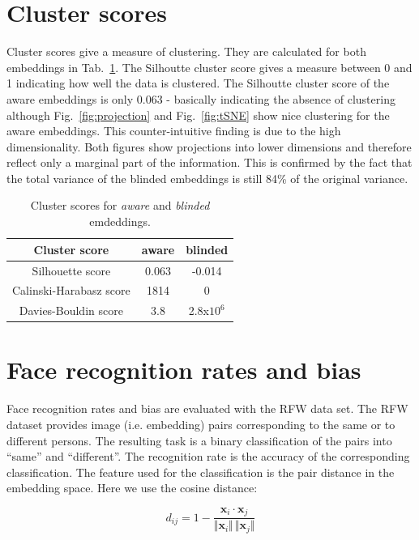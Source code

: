 \documentclass{report}
\begin{document}
\section{Cluster scores}

Cluster scores give a measure of clustering. They are calculated for both embeddings in Tab.~\ref{tab:cluster}. The Silhoutte cluster score gives a measure between 0 and 1 indicating how well the data is clustered. The Silhoutte cluster score of the aware embeddings is only 0.063 -  basically indicating the absence of clustering although Fig.~\ref{fig:projection} and Fig.~\ref{fig:tSNE} show nice clustering for the aware embeddings. This counter-intuitive finding is due to the high dimensionality. Both figures show projections into lower dimensions and therefore reflect only a marginal part of the information. This is confirmed by the fact that the total variance of the blinded embeddings is still 84\% of the original variance.   

\begin{table}
\begin{center}
\begin{tabular}{ c|c|c }
Cluster score & aware  & blinded  \\
\hline
Silhouette score & 0.063 & -0.014 \\ 
Calinski-Harabasz score & 1814 & 0 \\  
Davies-Bouldin score & 3.8 & 2.8x$10^6$  
\end{tabular}
\end{center}
\caption{Cluster scores for  \emph{aware}  and  \emph{blinded} emdeddings.}
\label{tab:cluster}
\end{table}

\section{Face recognition rates and bias}

Face recognition rates and bias are evaluated with the RFW data set. The RFW dataset provides image (i.e. embedding) pairs corresponding to the same or to different persons. The resulting task is a binary classification of the pairs into ``same'' and ``different''. The recognition rate is the accuracy of the corresponding classification. The feature used for the classification is the pair distance in the embedding space. Here we use the cosine distance:

\begin{equation}
\label{eq:cos}
	d_{ij} = 1 - \frac{\bm{x}_i\cdot \bm{x}_j}{\Vert \bm{x}_i \Vert\,\Vert \bm{x}_j \Vert }
\end{equation} 
\end{document}
